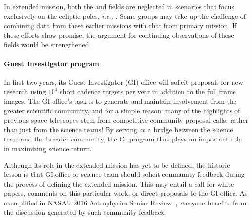\begin{itemize}
	In \tesss extended mission, both the \corot and \most fields are neglected in scenarios that focus exclusively on the ecliptic poles, \textit{i.e.,} \npole.
	Some groups may take up the challenge of combining data from these earlier missions with that from \tesss primary mission.
	If these efforts show promise, the argument for continuing observations of these fields would be strengthened.
\end{itemize}

\paragraph{Guest Investigator program}
In \tesss first two years, its Guest Investigator (GI) office will solicit proposals for new research using $10^4$ short cadence targets per year in addition to the full frame images.
The GI office's task is to generate and maintain involvement from the greater scientific community, and for a simple reason: many of the highlights of previous space telescopes stem from competitive community proposal calls, rather than just from the science teams!
By serving as a bridge between the science team and the broader community, the GI program thus plays an important role in maximizing \tesss science return.

Although its role in the extended mission has yet to be defined, the historic lesson is that \tesss GI office or science team should solicit community feedback during the process of defining the extended mission.
This may entail a call for white papers, comments on this particular work, or direct proposals to the GI office.
As exemplified in NASA's 2016 Astrophysics Senior Review~\citep{donahue_senior_2016}, everyone benefits from the discussion generated by such community feedback.


